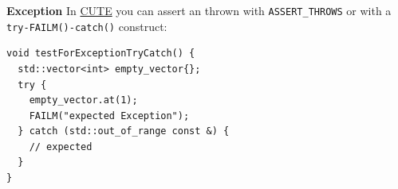 \documentclass[11pt,twoside,landscape]{article}
\begin{document}
\begin{multicols}{3}
\textbf{Exception}
In \href{../../../roam/20210920103820-cute.org}{CUTE} you can assert an thrown with \texttt{ASSERT\_THROWS} or with a \texttt{try-FAILM()-catch()} construct:
\lstset{language=c++,label= ,caption= ,captionpos=b,numbers=none}
\begin{lstlisting}
void testForExceptionTryCatch() {
  std::vector<int> empty_vector{};
  try {
    empty_vector.at(1);
    FAILM("expected Exception");
  } catch (std::out_of_range const &) {
    // expected
  }
}
\end{lstlisting}

\end{multicols}
\end{document}
